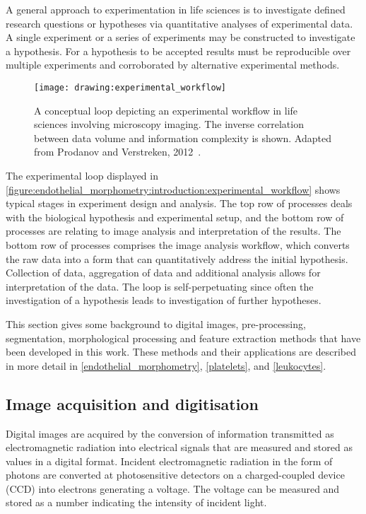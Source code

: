 A general approach to experimentation in life sciences is to investigate defined research questions or hypotheses via quantitative analyses of experimental data. A single experiment or a series of experiments may be constructed to investigate a hypothesis. For a hypothesis to be accepted results must be reproducible over multiple experiments and corroborated by alternative experimental methods.

\begin{figure}[htbp!]
	\centering
	\texttt{[image: drawing:experimental\_workflow]}
	\caption[Experimental workflow in life science imaging]{A conceptual loop depicting an experimental workflow in life sciences involving microscopy imaging. The inverse correlation between data volume and information complexity is shown. Adapted from Prodanov and Verstreken, 2012~\cite{Prodanov2012}.}
	\label{figure:endothelial_morphometry:introduction:experimental_workflow}
\end{figure}

The experimental loop displayed in \autoref{figure:endothelial_morphometry:introduction:experimental_workflow} shows typical stages in experiment design and analysis. The top row of processes deals with the biological hypothesis and experimental setup, and the bottom row of processes are relating to image analysis and interpretation of the results. The bottom row of processes comprises the image analysis workflow, which converts the raw data into a form that can quantitatively address the initial hypothesis. Collection of data, aggregation of data and additional analysis allows for interpretation of the data. The loop is self-perpetuating since often the investigation of a hypothesis leads to investigation of further hypotheses.

This section gives some background to digital images, pre-processing, segmentation, morphological processing and feature extraction methods that have been developed in this work. These methods and their applications are described in more detail in \autoref{endothelial_morphometry}, \autoref{platelets}, and \autoref{leukocytes}.

\subsection{Image acquisition and digitisation}
\label{introduction:image_processing:image_acquisition}
Digital images are acquired by the conversion of information transmitted as electromagnetic radiation into electrical signals that are measured and stored as values in a digital format. Incident electromagnetic radiation in the form of photons are converted at photosensitive detectors on a charged-coupled device (CCD) into electrons generating a voltage. The voltage can be measured and stored as a number indicating the intensity of incident light.

